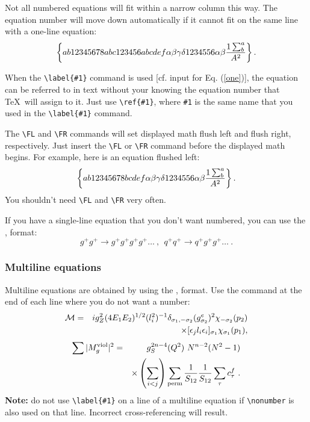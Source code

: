 Not all numbered equations will fit
within a narrow column this way. The equation number will move down
automatically if it cannot fit on the same line with a one-line equation:
\begin{equation}
\left\{ab12345678abc123456abcdef\alpha\beta\gamma\delta%
1234556\alpha\beta{1\sum^{a}_{b}\over A^2}\right\}.
\end{equation}

When the \verb+\label{#1}+ command is used [cf. input
for Eq. (\ref{one})],
the equation can be referred to in text without your knowing the
equation number that \TeX\ will assign to it. Just use
\verb+\ref{#1}+, where \verb+#1+ is the same name that you used in the
\verb+\label{#1}+ command.

The \verb+\FL+ and  \verb+\FR+ commands will set displayed math flush
left and flush right, respectively. Just insert the \verb+\FL+ or  \verb+\FR+
command before the displayed math begins. For example, here is an equation
flushed left:
\FL
\begin{equation}
\left\{ab12345678bcdef\alpha\beta\gamma\delta%
1234556\alpha\beta{1\sum^{a}_{b}\over A^2}\right\}.
\end{equation}
You shouldn't need \verb+\FL+ and  \verb+\FR+  very often.


If you have a single-line equation that you don't want
numbered, you can use the \btt{[}, \btt{]} format:
\[g^+g^+ \rightarrow g^+g^+g^+g^+ \dots ~,~~q^+q^+\rightarrow
q^+g^+g^+ \dots ~. \]

\subsubsection{Multiline equations}

Multiline equations are obtained by using the
,  format.
Use the 
command at the end of each line where you do not want a number:
\begin{eqnarray}
{\cal M}=&&ig_Z^2(4E_1E_2)^{1/2}(l_i^2)^{-1}
\delta_{\sigma_1,-\sigma_2}
(g_{\sigma_2}^e)^2\chi_{-\sigma_2}(p_2)\nonumber\\
&&\times
[\epsilon_jl_i\epsilon_i]_{\sigma_1}\chi_{\sigma_1}(p_1),
\end{eqnarray}
\begin{eqnarray}
\sum \vert M^{\rm viol}_g \vert ^2&=&g^{2n-4}_S(Q^2)~N^{n-2}
        (N^2-1)\nonumber \\
 & &\times \left( \sum_{i<j}\right)
  \sum_{\rm perm}
 {1 \over S_{12}}
 {1 \over S_{12}}\sum_\tau c^f_\tau~.
\end{eqnarray}
{\bf Note:} do not use \verb+\label{#1}+ on a line of a multiline
equation if \verb+\nonumber+ is also used on that line. Incorrect
cross-referencing will result.

